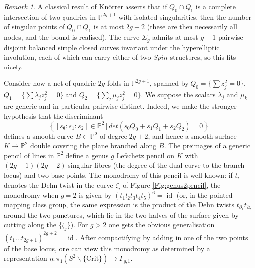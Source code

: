 \documentclass[reqno,10pt]{amsart}
\numberwithin{equation}{section}
\newcommand{\bP}{{\mathbb P}}
\newcommand{\id}{\operatorname{id}}
\theoremstyle{remark}
\newtheorem{Remark}[thm]{Remark}
\begin{document}
\begin{Remark}
A classical result of Kn\"orrer \cite{Knorrer} asserts that if $Q_0 \cap Q_1$ is a complete intersection of two quadrics in $\bP^{2g+1}$ with isolated singularities, then the number of singular points of $Q_0 \cap Q_1$ is at most $2g+2$ (these are then necessarily all nodes, and the bound is realised).  The curve $\Sigma_g$ admits at most $g+1$ pairwise disjoint balanced simple closed curves invariant under the hyperelliptic involution, each of which can carry either of two $Spin$ structures, so this fits nicely.  
\end{Remark}

  Consider now a net of quadric $2g$-folds in $\bP^{2g+1}$, spanned by $Q_0 = \{\sum z_j^2=0\}$, $Q_1 = \{\sum \lambda_jz_j^2 = 0\}$ and $Q_2 = \{\sum_j \mu_jz_j^2 = 0\}$.   We suppose the scalars $\lambda_j$ and $\mu_k$ are generic and in particular pairwise distinct. Indeed, we make the stronger hypothesis that the discriminant
\[
\left\{ [s_0:s_1:s_2] \in \bP^2 \, \big| \, det(s_0Q_0+s_1Q_1+s_2Q_2) = 0 \right\}
\]
defines a smooth curve $B\subset \bP^2$ of degree $2g+2$, and hence a smooth surface $K\rightarrow \bP^2$ double covering the plane branched along $B$.     The preimages of a generic pencil of lines in $\bP^2$ define a genus $g$ Lefschetz pencil on $K$ with $(2g+1)(2g+2)$ singular fibres (the degree of the dual curve to the branch locus) and two base-points.  The monodromy of this pencil is well-known:  if $t_i$ denotes the Dehn twist in the curve $\zeta_i$ of Figure \ref{Fig:genus2pencil}, the monodromy when $g=2$ is given by $(t_1t_2t_3t_4t_5)^6 = \id$ (or, in the pointed mapping class group, the same expression is the product of the Dehn twists $t_{\partial_1}t_{\partial_2}$ around the two punctures, which lie in the two halves of the surface given by cutting along the $\{\zeta_j\}$).  For $g>2$ one gets the obvious generalisation $(t_1\ldots t_{2g+1})^{2g+2} = \id$.  After compactifying by adding in one of the two points of the base locus, one can view this monodromy as determined by a representation $\eta: \pi_1(S^2 \backslash \{\mathrm{Crit}\}) \rightarrow \Gamma_{g,1}$.
\end{document}
